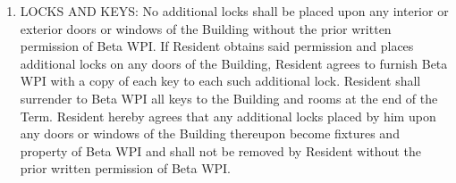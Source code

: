 \documentclass[legalpaper, 12pt]{article}
\begin{document}
\begin{enumerate}
        \item LOCKS AND KEYS\@: No additional locks shall be placed upon any
                interior or exterior doors or windows of the Building without
                the prior written permission of Beta WPI\@.  If Resident obtains
                said permission and places additional locks on any doors of the
                Building, Resident agrees to furnish Beta WPI with a copy of
                each key to each such additional lock.  Resident shall surrender
                to Beta WPI all keys to the Building and rooms at the end of the
                Term.  Resident hereby agrees that any additional locks placed
                by him upon any doors or windows of the Building thereupon
                become fixtures and property of Beta WPI and shall not be
                removed by Resident without the prior written permission of Beta
                WPI\@.


\end{enumerate}
\end{document}

